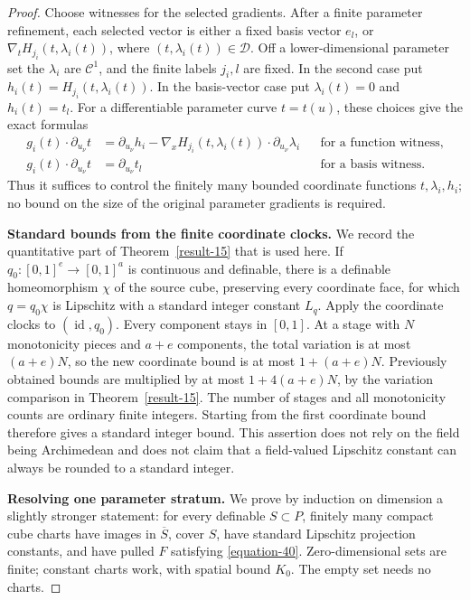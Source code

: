 \documentclass[11pt,a4paper]{article}
\theoremstyle{definition}
\begin{document}
\begin{proof}
Choose witnesses for the selected gradients. After a finite
parameter refinement, each selected vector is either a fixed
basis vector \(e_l\), or
\(\nabla_tH_{j_i}(t,\lambda_i(t))\), where
\((t,\lambda_i(t))\in\mathcal D\). Off a lower-dimensional
parameter set the \(\lambda_i\) are \(\mathcal C^1\), and the
finite labels \(j_i,l\) are fixed. In the second case put
\(h_i(t)=H_{j_i}(t,\lambda_i(t))\). In the basis-vector case put
\(\lambda_i(t)=0\) and \(h_i(t)=t_l\).
For a differentiable parameter curve \(t=t(u)\), these choices
give the exact formulas
\begin{equation}
 \begin{aligned}
 g_i(t)\cdot\partial_{u_\nu}t
 &=\partial_{u_\nu}h_i
   -\nabla_xH_{j_i}(t,\lambda_i(t))
                  \cdot\partial_{u_\nu}\lambda_i
      &&\text{for a function witness},\\
 g_i(t)\cdot\partial_{u_\nu}t
 &=\partial_{u_\nu}t_l
      &&\text{for a basis witness}.
 \end{aligned}
 \label{equation-45}
\end{equation}
Thus it suffices to control the finitely many bounded coordinate
functions \(t,\lambda_i,h_i\); no bound on the size of the original
parameter gradients is required.

\textbf{Standard bounds from the finite coordinate clocks.}
We record the quantitative part of Theorem~\ref{result-15} that is used here.
If \(q_0:[0,1]^e\to[0,1]^a\) is continuous and definable, there is
a definable homeomorphism \(\chi\) of the source cube, preserving
every coordinate face, for which \(q=q_0\chi\) is Lipschitz with
a standard integer constant \(L_q\). Apply the coordinate clocks
to \((\operatorname{id},q_0)\). Every component stays in \([0,1]\).
At a stage with \(N\) monotonicity pieces and \(a+e\) components,
the total variation is at most \((a+e)N\), so the new coordinate
bound is at most \(1+(a+e)N\). Previously obtained bounds are
multiplied by at most \(1+4(a+e)N\), by the variation comparison
in Theorem~\ref{result-15}. The number of stages and all monotonicity counts are
ordinary finite integers. Starting from the first coordinate
bound therefore gives a standard integer bound. This assertion
does not rely on the field being Archimedean and does not claim
that a field-valued Lipschitz constant can always be rounded to
a standard integer.

\textbf{Resolving one parameter stratum.}
We prove by induction on dimension a slightly stronger statement:
for every definable \(S\subset P\), finitely many compact cube
charts have images in \(\overline S\), cover \(S\), have standard
Lipschitz projection constants, and have pulled \(F\) satisfying
\eqref{equation-40}. Zero-dimensional sets are finite; constant charts work,
with spatial bound \(K_0\). The empty set needs no charts.


\end{proof}
\end{document}
